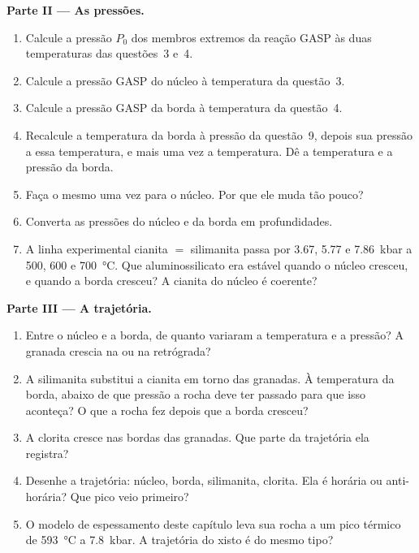 \begin{problem}
\noindent\textbf{Parte II --- As pressões.}
\begin{enumerate}[resume]
\item Calcule a pressão $P_0$ dos membros extremos da reação GASP às duas temperaturas
das questões~3 e~4.
\item Calcule a pressão GASP do núcleo à temperatura da questão~3.
\item Calcule a pressão GASP da borda à temperatura da questão~4.
\item Recalcule a temperatura da borda à pressão da questão~9, depois sua
pressão a essa temperatura, e mais uma vez a temperatura. Dê a temperatura e a
pressão da borda.
\item Faça o mesmo uma vez para o núcleo. Por que ele muda tão pouco?
\item Converta as pressões do núcleo e da borda em profundidades.
\item A linha experimental cianita $=$ silimanita passa por 3.67, 5.77 e
\qty{7.86}{kbar} a 500, 600 e \qty{700}{\celsius}. Que aluminossilicato era estável
quando o núcleo cresceu, e quando a borda cresceu? A cianita do núcleo é coerente?
\end{enumerate}

\noindent\textbf{Parte III --- A trajetória.}
\begin{enumerate}[resume]
\item Entre o núcleo e a borda, de quanto variaram a temperatura e a pressão?
A granada crescia na  ou na retrógrada?
\item A silimanita substitui a cianita em torno das granadas. À temperatura da borda,
abaixo de que pressão a rocha deve ter passado para que isso aconteça? O que a rocha fez
depois que a borda cresceu?
\item A clorita cresce nas bordas das granadas. Que parte da trajetória ela registra?
\item Desenhe a trajetória: núcleo, borda, silimanita, clorita. Ela é horária ou anti-horária?
Que pico veio primeiro?
\item O modelo de espessamento deste capítulo leva sua rocha a um pico térmico de
\qty{593}{\celsius} a \qty{7.8}{kbar}. A trajetória do xisto é do mesmo tipo?
\end{enumerate}


\end{problem}
